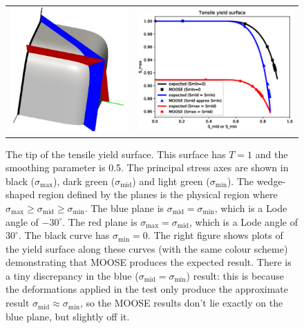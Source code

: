 \documentclass[]{scrreprt}
\newcommand{\smax}{\sigma_{\mathrm{max}}}
\newcommand{\smid}{\sigma_{\mathrm{mid}}}
\newcommand{\smin}{\sigma_{\mathrm{min}}}
\begin{document}
\begin{figure}[htb]
  \begin{center}
    \begin{tabular}{ll}
      \includegraphics[width=6cm]{tensile_with_planes.eps} &
      \includegraphics[width=8cm]{small_deform_5_6_7.eps}
    \end{tabular}
\caption{The tip of the tensile yield surface.  This surface has $T=1$
  and the smoothing parameter is 0.5.  The
  principal stress axes are shown in black ($\smax$), dark green
  ($\smid$) and light green ($\smin$).  The wedge-shaped region
  defined by the planes is the physical region where
  $\smax\geq\smid\geq\smin$.  The blue plane is $\smid=\smin$, which
  is a Lode angle of $-30^{\circ}$.  The red plane is $\smax=\smid$,
  which is a Lode angle of $30^{\circ}$.  The black curve has
  $\smin=0$.  The right figure shows plots of the yield surface along
  these curves (with the same colour scheme) demonstrating that MOOSE
  produces the expected result.  There is a tiny discrepancy in the
  blue ($\smid=\smin$) result: this is because the deformations
  applied in the test only produce the approximate result
  $\smid\approx\smin$, so the MOOSE results don't lie exactly on the
  blue plane, but slightly off it.}
\label{small_deform_5_6_7.fig}
\end{center}
\end{figure}
\end{document}

